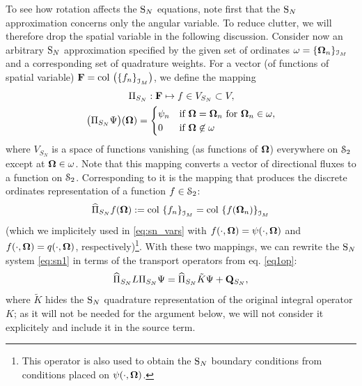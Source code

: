 To see how rotation affects the $\text{S}_{N}$ equations, note first that the $\text{S}_{N}$ approximation concerns only the angular
variable. To reduce clutter, we will therefore drop the spatial variable in the following
discussion.
Consider now an arbitrary $\text{S}_{N}$ approximation specified by the given set of ordinates
$\omega = \{\mathbf{\Omega}_n\}_{\mathcal{I}_{M}}$ and a corresponding set of quadrature weights.
For a vector (of functions of spatial variable) $\mathbf{F} = \operatorname{col\,}\left(\left\{f_n\right\}_{\mathcal{I}_{M}}\right)$, we define the mapping
\begin{equation}\label{eq:map_SN}
\begin{gathered}
\Pi_{S_N}: \mathbf{F} \mapsto f\in V_{S_N}\subset V,\\
\bigl(\Pi_{S_N} \Psi\bigr)(\mathbf{\Omega}) = 
\begin{cases}\displaystyle \psi_n & \mbox{if $\mathbf{\Omega} = \mathbf{\Omega}_n$ for $\mathbf{\Omega}_n \in \omega$},\\ 0 & \mbox{if $\mathbf{\Omega} \not
	\in \omega$} \end{cases}
\end{gathered}
\end{equation}
where $V_{S_N}$ is a space of functions vanishing (as functions of $\mathbf{\Omega}$) everywhere on $\mathcal{S}_2$ except at $\mathbf{\Omega}
\in \omega$. Note that this mapping converts a vector of directional fluxes to a function on $\mathcal{S}_2$. Corresponding to
it is the mapping that produces the discrete ordinates representation of a function $f\in\mathcal{S}_2$: 
\begin{equation}\label{eq:map_SN_inv}
	\widehat\Pi_{S_N} f(\mathbf{\Omega}) := \operatorname{col\,}\left\{f_n \right\}_{\mathcal{I}_{M}}
	 = \operatorname{col\,}\left\{f(\mathbf{\Omega}_n)\right\}_{\mathcal{I}_{M}}
\end{equation}
(which we implicitely used in \eqref{eq:sn_vars} with $f(\cdot,\mathbf{\Omega}) = \psi(\cdot,\mathbf{\Omega})$ and
$f(\cdot,\mathbf{\Omega}) = q(\cdot,\mathbf{\Omega})$, respectively)\footnote{This operator is also used to obtain the $\text{S}_{N}$ boundary
conditions from conditions placed on $\psi(\cdot,\mathbf{\Omega})$.}.
With these two mappings, we can rewrite the $\text{S}_{N}$ system \eqref{eq:sn1} in terms of the transport operators from eq.
\eqref{eq1op}:
\begin{equation}\label{eq:sn_op}
	\widehat\Pi_{S_N} L\Pi_{S_N} \Psi = \widehat\Pi_{S_N}\tilde K\Psi + \mathbf{Q}_{S_N},
\end{equation}
where $\tilde K$ hides the $\text{S}_{N}$ quadrature representation of the original integral operator $K$; as it
will not be needed for the argument below, we will not consider it explicitely and include it in the source term.


